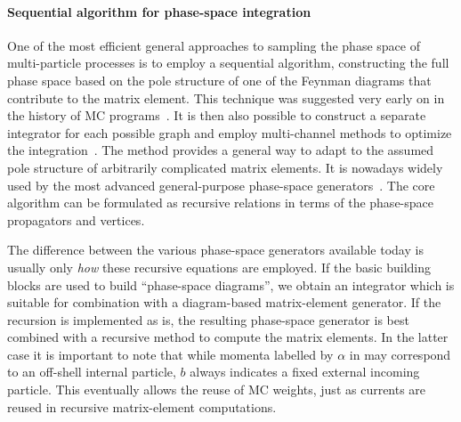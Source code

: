 \paragraph{Sequential algorithm for phase-space integration}
\label{sec:sequential_phasespace}
One of the most efficient general approaches to sampling the phase space 
of multi-particle processes is to employ a sequential algorithm, constructing
the full phase space based on the pole structure of one of the Feynman diagrams
that contribute to the matrix element. This technique was suggested 
very early on in the history of MC programs~\cite{Byckling:1969sx}. 
It is then also possible to construct a separate integrator for each possible 
graph and employ multi-channel methods to optimize the integration~\cite{Kleiss:1994qy}. 
The method provides a general way to adapt to the assumed pole structure of 
arbitrarily complicated matrix elements. It is nowadays widely used 
by the most advanced general-purpose phase-space generators~\cite{
  Kanaki:2000ey,Papadopoulos:2000tt,Cafarella:2007pc,
  Krauss:2001iv,Maltoni:2002qb,Alwall:2007st,Gleisberg:2008fv}. 
The core algorithm can be formulated as recursive relations in terms 
of the phase-space propagators and vertices.

The difference between the various phase-space generators available
today is usually only {\it how} these recursive equations are employed.
If the basic building blocks are 
used to build ``phase-space diagrams'', we obtain an integrator which is
suitable for combination with a diagram-based matrix-element generator.
If the recursion is implemented as is, the resulting phase-space generator
is best combined with a recursive method to compute the matrix elements.
In the latter case it is important to note that while momenta 
labelled by $\alpha$ in  
may correspond to an off-shell internal particle, $b$ always indicates 
a fixed external incoming particle. This eventually allows the reuse of 
MC weights, just as currents are reused in recursive matrix-element 
computations. 
\fi

